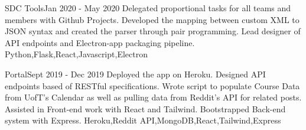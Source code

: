 %
%
%


\begin{projects}
	\project
	{SDC Tools}{Jan 2020 - May 2020}
	{}
	{Delegated proportional tasks for all teams and members with Github Projects. Developed the mapping between custom XML to JSON syntax and created the parser through pair programming. Lead designer of API endpoints and Electron-app packaging pipeline.}
	{Python,Flask,React,Javascript,Electron}
				
	\project
	{Portal}{Sept 2019 - Dec 2019}
	{ }
	{Deployed the app on Heroku. Designed API endpoints based of RESTful specifications. Wrote script to populate Course Data from UofT's Calendar as well as pulling data from Reddit's API for related posts. Assisted in Front-end work with React and Tailwind. Bootstrapped Back-end system with Express.}
	{Heroku,Reddit API,MongoDB,React,Tailwind,Express}

\end{projects}

